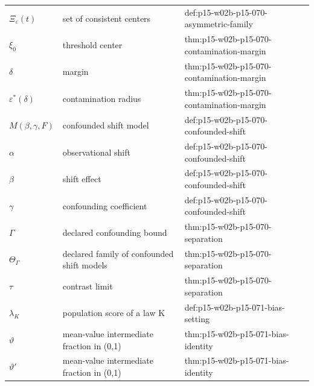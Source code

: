 \begin{longtable}{@{}p{}p{}p{}@{}}
\(\Xi_\varepsilon(t)\) & set of consistent centers & def:\allowbreak{}p15-\allowbreak{}w02b-\allowbreak{}p15-\allowbreak{}070-\allowbreak{}asymmetric-\allowbreak{}family \\
\(\xi_0\) & threshold center & thm:\allowbreak{}p15-\allowbreak{}w02b-\allowbreak{}p15-\allowbreak{}070-\allowbreak{}contamination-\allowbreak{}margin \\
\(\delta\) & margin & thm:\allowbreak{}p15-\allowbreak{}w02b-\allowbreak{}p15-\allowbreak{}070-\allowbreak{}contamination-\allowbreak{}margin \\
\(\varepsilon^*(\delta)\) & contamination radius & thm:\allowbreak{}p15-\allowbreak{}w02b-\allowbreak{}p15-\allowbreak{}070-\allowbreak{}contamination-\allowbreak{}margin \\
\(M(\beta,\allowbreak \gamma,\allowbreak F)\) & confounded shift model & def:\allowbreak{}p15-\allowbreak{}w02b-\allowbreak{}p15-\allowbreak{}070-\allowbreak{}confounded-\allowbreak{}shift \\
\(\alpha\) & observational shift & def:\allowbreak{}p15-\allowbreak{}w02b-\allowbreak{}p15-\allowbreak{}070-\allowbreak{}confounded-\allowbreak{}shift \\
\(\beta\) & shift effect & def:\allowbreak{}p15-\allowbreak{}w02b-\allowbreak{}p15-\allowbreak{}070-\allowbreak{}confounded-\allowbreak{}shift \\
\(\gamma\) & confounding coefficient & def:\allowbreak{}p15-\allowbreak{}w02b-\allowbreak{}p15-\allowbreak{}070-\allowbreak{}confounded-\allowbreak{}shift \\
\(\Gamma\) & declared confounding bound & thm:\allowbreak{}p15-\allowbreak{}w02b-\allowbreak{}p15-\allowbreak{}070-\allowbreak{}separation \\
\(\Theta_\Gamma\) & declared family of confounded shift models & thm:\allowbreak{}p15-\allowbreak{}w02b-\allowbreak{}p15-\allowbreak{}070-\allowbreak{}separation \\
\(\tau\) & contrast limit & thm:\allowbreak{}p15-\allowbreak{}w02b-\allowbreak{}p15-\allowbreak{}070-\allowbreak{}separation \\
\(\lambda_K\) & population score of a law K & def:\allowbreak{}p15-\allowbreak{}w02b-\allowbreak{}p15-\allowbreak{}071-\allowbreak{}bias-\allowbreak{}setting \\
\(\vartheta\) & mean-value intermediate fraction in (0,1) & thm:\allowbreak{}p15-\allowbreak{}w02b-\allowbreak{}p15-\allowbreak{}071-\allowbreak{}bias-\allowbreak{}identity \\
\(\vartheta'\) & mean-value intermediate fraction in (0,1) & thm:\allowbreak{}p15-\allowbreak{}w02b-\allowbreak{}p15-\allowbreak{}071-\allowbreak{}bias-\allowbreak{}identity \\

\end{longtable}
